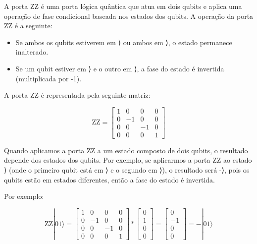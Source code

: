 \documentclass[
  brazilian,
]{report}
\providecommand{\tightlist}{%
  \setlength{\itemsep}{0pt}\setlength{\parskip}{0pt}}
\begin{document}
A porta ZZ é uma porta lógica quântica que atua em dois qubits e aplica
uma operação de fase condicional baseada nos estados dos qubits. A
operação da porta ZZ é a seguinte:

\begin{itemize}
\tightlist
\item
  Se ambos os qubits estiverem em ⟩ ou ambos em ⟩, o
  estado permanece inalterado.
\item
  Se um qubit estiver em ⟩ e o outro em ⟩, a fase do
  estado é invertida (multiplicada por -1).
\end{itemize}

A porta ZZ é representada pela seguinte matriz:

\[
\text{ZZ} =
\begin{bmatrix}
1 & 0 & 0 & 0 \\
0 & -1 & 0 & 0 \\
0 & 0 & -1 & 0 \\
0 & 0 & 0 & 1
\end{bmatrix}
\]

Quando aplicamos a porta ZZ a um estado composto de dois qubits, o
resultado depende dos estados dos qubits. Por exemplo, se aplicarmos a
porta ZZ ao estado ⟩ (onde o primeiro qubit está em ⟩
e o segundo em ⟩), o resultado será -⟩, pois os
qubits estão em estados diferentes, então a fase do estado é invertida.

Por exemplo:

\[
\text{ZZ}|01⟩ =
\begin{bmatrix}
1 & 0 & 0 & 0 \\
0 & -1 & 0 & 0 \\
0 & 0 & -1 & 0 \\
0 & 0 & 0 & 1
\end{bmatrix} *
\begin{bmatrix}
0 \\
1 \\
0 \\
0
\end{bmatrix}
= 
\begin{bmatrix}
0 \\
-1 \\
0 \\
0
\end{bmatrix}
= -|01⟩
\]
\end{document}
